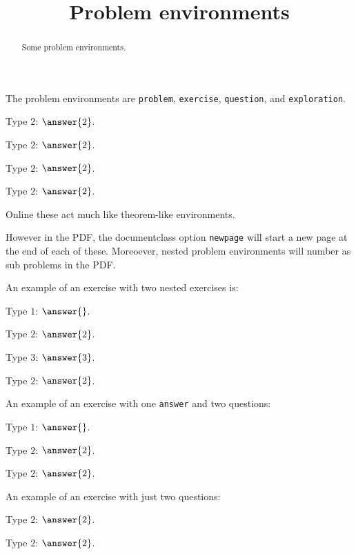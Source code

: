 \documentclass{ximera}
\title{Problem environments}
\begin{document}
\begin{abstract}
  Some problem environments.
\end{abstract}
\maketitle

The problem environments are \verb|problem|, \verb|exercise|, \verb|question|, and \verb|exploration|.


\begin{exercise}
  Type $2$: $\answer{2}$.
\end{exercise}

\begin{problem}
  Type $2$: $\answer{2}$.
\end{problem}

\begin{question}
  Type $2$: $\answer{2}$.
\end{question}

\begin{exploration}
  Type $2$: $\answer{2}$.
\end{exploration}

Online these act much like theorem-like environments.

However in the PDF, the documentclass option \verb|newpage| will start
a new page at the end of each of these. Moreoever, nested problem
environments will number as sub problems in the PDF.

An example of an exercise with two nested exercises is:
\begin{exercise}
  Type $1$: $\answer{}$.
  \begin{exercise}
    Type $2$: $\answer{2}$.
    \begin{exercise}
      Type $3$: $\answer{3}$.
    \end{exercise}
  \end{exercise}
  \begin{exercise}
    Type $2$: $\answer{2}$.
  \end{exercise}
\end{exercise}


An example of an exercise with one \verb|answer| and two questions:

\begin{exercise}
  Type $1$: $\answer{}$.
  \begin{question}
    Type $2$: $\answer{2}$.
  \end{question}
  \begin{question}
    Type $2$: $\answer{2}$.
  \end{question}
\end{exercise}

An example of an exercise with just two questions:

\begin{exercise}
  \begin{question}
    Type $2$: $\answer{2}$.
  \end{question}
  \begin{question}
    Type $2$: $\answer{2}$.
  \end{question}
\end{exercise}
\end{document}
